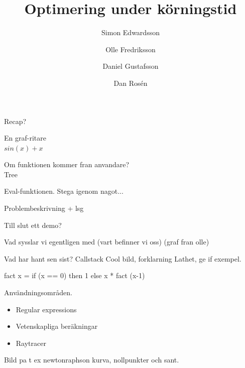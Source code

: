 \documentclass{beamer}
\begin{document}
\title{Optimering under körningstid}


\author{Simon Edwardsson\smiley \and Olle Fredriksson\smiley
\and \linebreak{}
Daniel Gustafsson\smiley \and Dan Rosén\frownie}



\everymath{\displaystyle}

\begin{frame}
    \titlepage
\end{frame}

\begin{frame}

	Recap?

\end{frame}

\begin{frame}


	En graf-ritare\\
	\pause
	$sin(x) + x$
	
	Om funktionen kommer fran anvandare?\\
	\pause
	Tree

	\pause
	Eval-funktionen.
	Stega igenom nagot...
	
	\pause
	Problembeskrivning + lsg

	\pause
	Till slut ett demo?

\end{frame}

\begin{frame}

	Vad sysslar vi egentligen med (vart befinner vi oss) (graf fran olle)

\end{frame}

\begin{frame}[fragile]
	Vad har hant sen sist?
	\pause
	Callstack
		Cool bild, forklarning
	\pause 
	Lathet, ge if exempel.

\begin{codeEx}
fact x = if (x == 0) 
    then 1
    else x * fact (x-1)
\end{codeEx}

\end{frame}

\begin{frame}
	Användningsområden.
\begin{itemize}
	\item Regular expressions
	\item Vetenskapliga beräkningar %
	\item Raytracer
\end{itemize}

Bild pa t ex newtonraphson kurva, nollpunkter och sant.

\end{frame}
\end{document}
